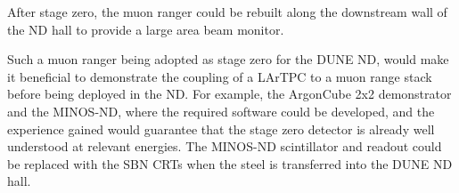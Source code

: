 \documentclass[a4paper]{article}
\begin{document}
After stage zero, the muon ranger could be rebuilt along the downstream wall of the ND hall to provide a large area  beam monitor. 

Such a muon ranger being adopted as stage zero for the DUNE ND, would make it beneficial to demonstrate the coupling of a LArTPC to a muon range stack before being deployed in the ND.
For example, the ArgonCube 2x2 demonstrator and the MINOS-ND, where the required software could be developed, and the experience gained would guarantee that the stage zero detector is already well understood at relevant energies. 
The MINOS-ND scintillator and readout could be replaced with the SBN CRTs when the steel is transferred into the DUNE ND hall.      

\printbibliography
\end{document}
